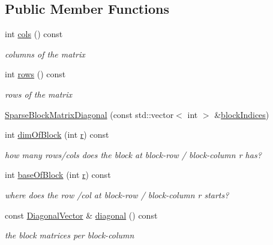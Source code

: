 \subsection*{Public Member Functions}
\begin{DoxyCompactItemize}
\item 
int \hyperlink{classg2o_1_1SparseBlockMatrixDiagonal_ad732f51a1553530d5645c24861975207}{cols} () const 
\begin{DoxyCompactList}\small\item\em columns of the matrix \end{DoxyCompactList}\item 
int \hyperlink{classg2o_1_1SparseBlockMatrixDiagonal_aa255d0a5069a9ad0ca6674a4e70c8397}{rows} () const 
\begin{DoxyCompactList}\small\item\em rows of the matrix \end{DoxyCompactList}\item 
\hyperlink{classg2o_1_1SparseBlockMatrixDiagonal_a0e01566c4ff881af058f366672291b27}{Sparse\+Block\+Matrix\+Diagonal} (const std\+::vector$<$ int $>$ \&\hyperlink{classg2o_1_1SparseBlockMatrixDiagonal_acac6778f21aea2355fccad48de1c6f08}{block\+Indices})
\item 
int \hyperlink{classg2o_1_1SparseBlockMatrixDiagonal_a80f1f9af0e97734b92f6c26054e8b316}{dim\+Of\+Block} (int \hyperlink{sparse__helper_8cpp_acab531abaa74a7e664e3986f2522b33a}{r}) const 
\begin{DoxyCompactList}\small\item\em how many rows/cols does the block at block-\/row / block-\/column r has? \end{DoxyCompactList}\item 
int \hyperlink{classg2o_1_1SparseBlockMatrixDiagonal_a282013b87fc71fa5ef6657ea4f58855d}{base\+Of\+Block} (int \hyperlink{sparse__helper_8cpp_acab531abaa74a7e664e3986f2522b33a}{r}) const 
\begin{DoxyCompactList}\small\item\em where does the row /col at block-\/row / block-\/column r starts? \end{DoxyCompactList}\item 
const \hyperlink{classg2o_1_1SparseBlockMatrixDiagonal_a2eb7fc4130fac5c499b57f3bec855812}{Diagonal\+Vector} \& \hyperlink{classg2o_1_1SparseBlockMatrixDiagonal_a762097ac116728fec0cc64cf05610a96}{diagonal} () const 
\begin{DoxyCompactList}\small\item\em the block matrices per block-\/column \end{DoxyCompactList}\item 

\end{DoxyCompactItemize}
